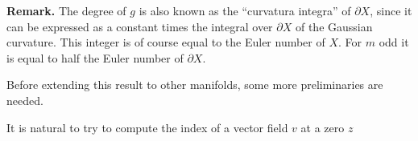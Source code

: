 \noindent\textbf{Remark.} The degree of $g$ is also known as the ``curvatura integra'' of $\partial X$, since it can be expressed as a constant times the integral over $\partial X$ of the Gaussian curvature. This integer is of course equal to the Euler number of $X$. For $m$ odd it is equal to half the Euler number of $\partial X$.

Before extending this result to other manifolds, some more preliminaries are needed.

It is natural to try to compute the index of a vector field $v$ at a zero $z$

